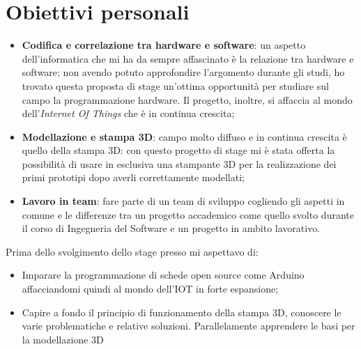 \section{Obiettivi personali}
\begin{itemize}
\item \textbf{Codifica e correlazione tra hardware e software}: un aspetto dell'informatica che mi ha da sempre affascinato è la relazione tra hardware e software; non avendo potuto approfondire l'argomento durante gli studi, ho trovato questa proposta di stage un'ottima opportunità per studiare sul campo la programmazione hardware. Il progetto, inoltre, si affaccia al mondo dell'\textit{Internet Of Things} che è in continua crescita;
\item \textbf{Modellazione e stampa 3D}: campo molto diffuso e in continua crescita è quello della stampa 3D: con questo progetto di stage mi è stata offerta la possibilità di usare in esclusiva una stampante 3D per la realizzazione dei primi prototipi dopo averli correttamente modellati;
\item \textbf{Lavoro in team}: fare parte di un team di sviluppo cogliendo gli aspetti in comune e le differenze tra un progetto accademico come quello svolto durante il corso di Ingegneria del Software e un progetto in ambito lavorativo.
\end{itemize}

Prima dello svolgimento dello stage presso \lab{} mi aspettavo di:
\begin{itemize}
\item Imparare la programmazione di schede open source come Arduino affacciandomi quindi al mondo dell'IOT in forte espansione;
\item Capire a fondo il principio di funzionamento della stampa 3D, conoscere le varie problematiche e relative soluzioni. Parallelamente apprendere le basi per la modellazione 3D
\end{itemize}
